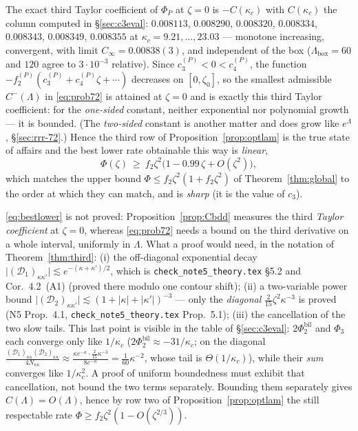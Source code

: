 \documentclass[11pt]{article}
\newcommand{\abs}[1]{\lvert#1\rvert}
\begin{document}
\begin{proposition}\label{prop:Cbdd}
The exact third Taylor coefficient of $\Phi_P$ at $\zeta=0$ is $-C(\kappa_c)$ with $C(\kappa_c)$ the
column computed in \S\ref{sec:c3eval}: $0.008113$, $0.008290$, $0.008320$, $0.008334$, $0.008343$,
$0.008349$, $0.008355$ at $\kappa_c=9.21,\dots,23.03$ --- monotone increasing, convergent, with
limit $C_\infty=0.00838(3)$, and independent of the box ($\Lambda_{\mathrm{box}}=60$ and $120$
agree to $3\cdot10^{-3}$ relative).  Since $c_3^{(P)}<0<c_4^{(P)}$, the function
$-f_2^{(P)}(c_3^{(P)}+c_4^{(P)}\zeta+\cdots)$ decreases on $[0,\zeta_0]$, so the smallest admissible
$C^-(\Lambda)$ in \eqref{eq:prob72} is attained at $\zeta=0$ and is exactly this third Taylor
coefficient: for the \emph{one-sided} constant, neither exponential nor polynomial growth --- it is
bounded.  (The \emph{two-sided} constant is another matter and does grow like $e^\Lambda$,
\S\ref{sec:rrr-72}.)  Hence the third row of Proposition~\ref{prop:optlam} is the true state of affairs and the
best lower rate obtainable this way is \emph{linear},
\begin{equation}\label{eq:bestlower}
 \Phi(\zeta)\ \ge\ f_2\zeta^2\bigl(1-0.99\,\zeta+O(\zeta^2)\bigr),
\end{equation}
which matches the upper bound $\Phi\le f_2\zeta^2(1+f_2\zeta^2)$ of Theorem~\ref{thm:global} to
the order at which they can match, and is \emph{sharp} (it is the value of $c_3$).
\end{proposition}

\begin{verdictgap}
\eqref{eq:bestlower} is not proved: Proposition~\ref{prop:Cbdd} measures the third
\emph{Taylor coefficient} at $\zeta=0$, whereas \eqref{eq:prob72} needs a bound on the third
derivative on a whole interval, uniformly in $\Lambda$.  What a proof would need, in the notation
of Theorem~\ref{thm:third}:
(i) the off-diagonal exponential decay $\abs{(\mathcal D_1)_{\kappa\kappa'}}\lesssim
e^{-(\kappa+\kappa')/2}$, which is \texttt{check\_note5\_theory.tex} \S5.2 and Cor.~4.2~(A1)
(proved there modulo one contour shift);
(ii) a two-variable power bound $\abs{(\mathcal D_2)_{\kappa\kappa'}}\lesssim
(1+\abs\kappa+\abs{\kappa'})^{-3}$ --- only the \emph{diagonal} $\frac2{15}\zeta^2\kappa^{-3}$ is
proved (N5 Prop.~4.1, \texttt{check\_note5\_theory.tex} Prop.~5.1);
(iii) the cancellation of the two slow tails.  This last point is visible in the table of
\S\ref{sec:c3eval}: $2\Phi_2^{\mathrm{bil}}$ and $\Phi_3$ each converge only like $1/\kappa_c$
($2\Phi_2^{\mathrm{bil}}\approx-31/\kappa_c$; on the diagonal
$\frac{(\mathcal D_1)_{\kappa\kappa}(\mathcal D_2)_{\kappa\kappa}}{4N_{\kappa\kappa}}\approx
\frac{\kappa e^{-\kappa}\cdot\frac2{15}\kappa^{-3}}{8e^{-\kappa}}=\frac1{60}\kappa^{-2}$, whose
tail is $\Theta(1/\kappa_c)$), while their \emph{sum} converges like $1/\kappa_c^2$.  A proof of
uniform boundedness must exhibit that cancellation, not bound the two terms separately.
Bounding them separately gives $C(\Lambda)=O(\Lambda)$, hence by row two of
Proposition~\ref{prop:optlam} the still respectable rate $\Phi\ge f_2\zeta^2(1-O(\zeta^{2/3}))$.
\end{verdictgap}
\end{document}
